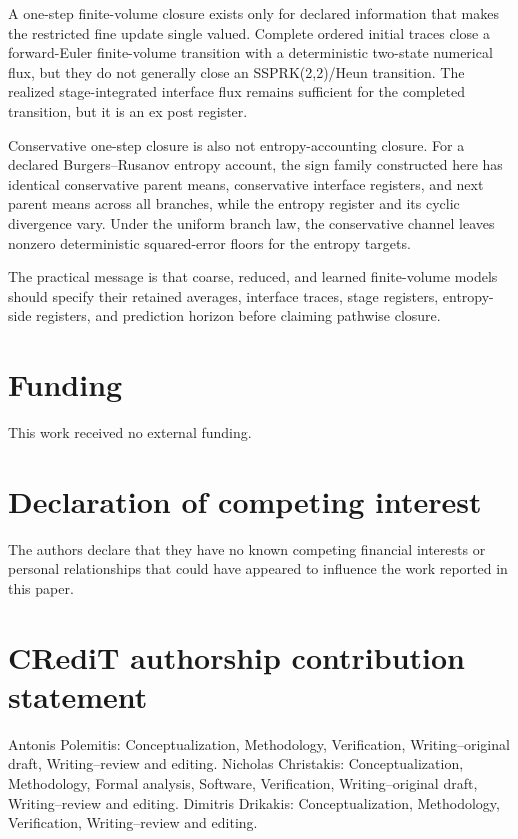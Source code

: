 \documentclass[a4paper,fleqn, sort&compress]{cas-sc}
\theoremstyle{remark}
\theoremstyle{definition}
\begin{document}
A one-step finite-volume closure exists only for declared information that
makes the restricted fine update single valued.  Complete ordered initial
traces close a forward-Euler finite-volume transition with a deterministic
two-state numerical flux, but they do not generally close an SSPRK(2,2)/Heun
transition.  The realized stage-integrated interface flux remains sufficient
for the completed transition, but it is an ex post register.

Conservative one-step closure is also not entropy-accounting closure.  For a
declared Burgers--Rusanov entropy account, the sign family constructed here
has identical conservative parent means, conservative interface registers,
and next parent means across all branches, while the entropy register and its
cyclic divergence vary.  Under the uniform branch law, the conservative
channel leaves nonzero deterministic squared-error floors for the entropy
targets.

The practical message is that coarse, reduced, and learned finite-volume
models should specify their retained averages, interface traces, stage
registers, entropy-side registers, and prediction horizon before claiming
pathwise closure.

\section*{Funding}

This work received no external funding.

\section*{Declaration of competing interest}

The authors declare that they have no known competing financial interests or
personal relationships that could have appeared to influence the work
reported in this paper.

\section*{CRediT authorship contribution statement}

Antonis Polemitis: Conceptualization, Methodology, Verification,
Writing--original draft, Writing--review and editing.  Nicholas Christakis:
Conceptualization, Methodology, Formal analysis, Software, Verification,
Writing--original draft, Writing--review and editing.  Dimitris Drikakis:
Conceptualization, Methodology, Verification, Writing--review and editing.
\end{document}

